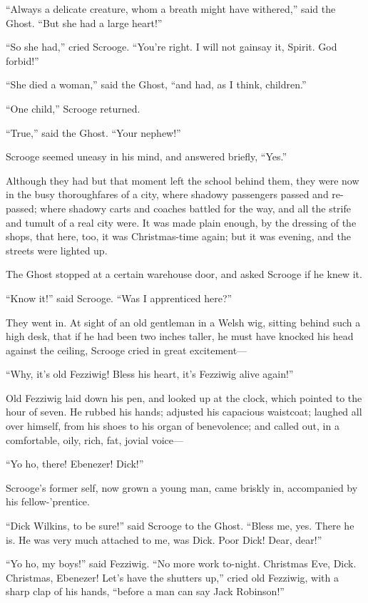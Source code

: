 \documentclass[paper=a5,BCOR=15mm,twoside,DIV=15,headinclude=off,12pt,chapterprefix=off,openany,headings=huge]{scrbook} %
\begin{document}
\enquote{Always a delicate creature, whom a breath might have withered,} said the Ghost. \enquote{But she had a large heart!}

\enquote{So she had,} cried Scrooge. \enquote{You're right. I will not gainsay it, Spirit. God forbid!}

\enquote{She died a woman,} said the Ghost, \enquote{and had, as I think, children.}

\enquote{One child,} Scrooge returned.

\enquote{True,} said the Ghost. \enquote{Your nephew!}

Scrooge seemed uneasy in his mind, and answered briefly, \enquote{Yes.}

Although they had but that moment left the school behind them, they were now in the busy thoroughfares of a city, where shadowy passengers passed and re-passed; where shadowy carts and coaches battled for the way, and all the strife and tumult of a real city were. It was made plain enough, by the dressing of the shops, that here, too, it was Christmas-time again; but it was evening, and the streets were lighted up.

The Ghost stopped at a certain warehouse door, and asked Scrooge if he knew it.

\enquote{Know it!} said Scrooge. \enquote{Was I apprenticed here?}

They went in. At sight of an old gentleman in a Welsh wig, sitting behind such a high desk, that if he had been two inches taller, he must have knocked his head against the ceiling, Scrooge cried in great excitement—

\enquote{Why, it's old Fezziwig! Bless his heart, it's Fezziwig alive again!}

Old Fezziwig laid down his pen, and looked up at the clock, which pointed to the hour of seven. He rubbed his hands; adjusted his capacious waistcoat; laughed all over himself, from his shoes to his organ of benevolence; and called out, in a comfortable, oily, rich, fat, jovial voice—

\enquote{Yo ho, there! Ebenezer! Dick!}

Scrooge's former self, now grown a young man, came briskly in, accompanied by his fellow-'prentice.

\enquote{Dick Wilkins, to be sure!} said Scrooge to the Ghost. \enquote{Bless me, yes. There he is. He was very much attached to me, was Dick. Poor Dick! Dear, dear!}

\enquote{Yo ho, my boys!} said Fezziwig. \enquote{No more work to-night. Christmas Eve, Dick. Christmas, Ebenezer! Let's have the shutters up,} cried old Fezziwig, with a sharp clap of his hands, \enquote{before a man can say Jack Robinson!}
\end{document}
